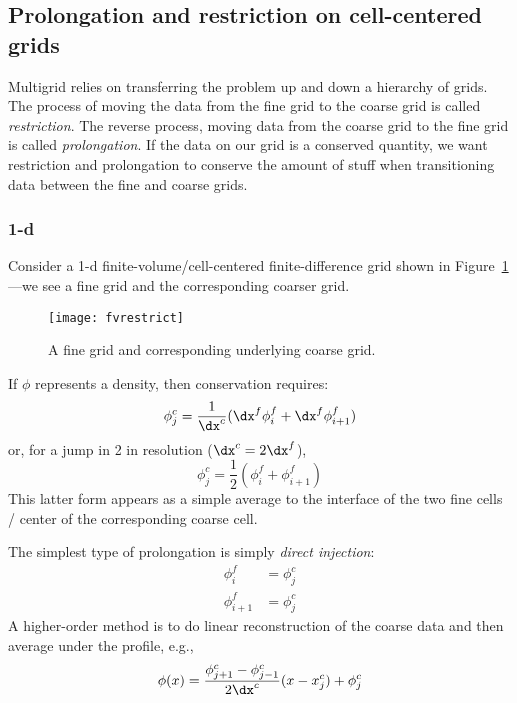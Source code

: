 \subsection{Prolongation and restriction on cell-centered grids}

Multigrid relies on transferring the problem up and down a hierarchy of
grids. 
The process of moving the data from the fine grid to the coarse grid
is called {\em restriction}.  The reverse process, moving data from
the coarse grid to the fine grid is called {\em prolongation}.  If the
data on our grid is a conserved quantity, we want restriction and prolongation to
conserve the amount of stuff when transitioning data between the fine and coarse grids.


\subsubsection{1-d}

Consider a 1-d finite-volume/cell-centered finite-difference grid
shown in Figure~\ref{fig:mg:1dgrid-prolong}---we see a fine grid and the
corresponding coarser grid.
%
\begin{figure}[t]
\centering
\texttt{[image: fvrestrict]}
\caption[The geometry for 1-d
  prolongation and restriction]{\label{fig:mg:1dgrid-prolong} A fine grid and
  corresponding underlying coarse grid.}
\end{figure}
%
If $\phi$ represents a density, then
conservation requires:
\begin{equation}
\phi^c_j = \frac{1}{\dx^c} (\dx^f \phi^f_i + \dx^f \phi^f_{i+1} )
\end{equation}
or, for a jump in 2 in resolution ($\dx^c = 2 \dx^f$), 
\begin{equation}
\phi^c_j = \frac{1}{2} (\phi^f_i + \phi^f_{i+1} )
\end{equation}
This latter form appears as a simple average to the interface of the
two fine cells / center of the corresponding coarse cell.

The simplest type of 
prolongation is simply {\em direct injection}:
\begin{align}
\phi^f_i &= \phi^c_j \\
\phi^f_{i+1} &= \phi^c_j 
\end{align}
A higher-order method is to do linear reconstruction of the coarse
data and then average under the profile, e.g., 
\begin{equation}
\phi(x) = \frac{\phi^c_{j+1} - \phi^c_{j-1}}{2\dx^c} (x - x_j^c) + \phi_j^c
\end{equation}

